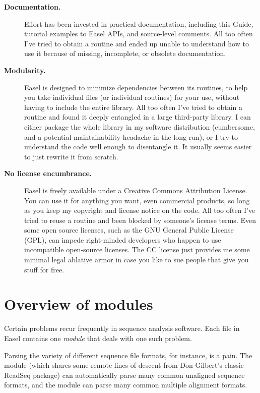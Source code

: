 \begin{description}
\item[\textbf{Documentation.}]  Effort has been invested in practical
documentation, including this Guide, tutorial examples to Easel APIs,
and source-level comments. All too often I've tried to obtain a
routine and ended up unable to understand how to use it because of
missing, incomplete, or obsolete documentation.

\item[\textbf{Modularity.}]  Easel is designed to minimize
dependencies between its routines, to help you take individual files
(or individual routines) for your use, without having to include the
entire library. All too often I've tried to obtain a routine and found it
deeply entangled in a large third-party library. I can either package
the whole library in my software distribution (cumbersome, and a
potential maintainability headache in the long run), or I try to
understand the code well enough to disentangle it. It usually seems
easier to just rewrite it from scratch.

\item[\textbf{No license encumbrance.}]  Easel is freely available
under a Creative Commons Attribution License. You can use it for
anything you want, even commercial products, so long as you keep my
copyright and license notice on the code. All too often I've tried to
reuse a routine and been blocked by someone's license terms. Even some
open source licenses, such as the GNU General Public License (GPL),
can impede right-minded developers who happen to use incompatible
open-source licenses. The CC license just provides me some minimal
legal ablative armor in case you like to sue people that give you
stuff for free.
\end{description}

\section{Overview of modules}

Certain problems recur frequently in sequence analysis software. Each
 file in Easel contains one \emph{module} that deals with
one such problem.

Parsing the variety of different sequence file formats, for instance,
is a pain. The  module (which shares some remote lines of
descent from Don Gilbert's classic ReadSeq package) can automatically
parse many common unaligned sequence formats, and the 
module can parse many common multiple alignment formats.

